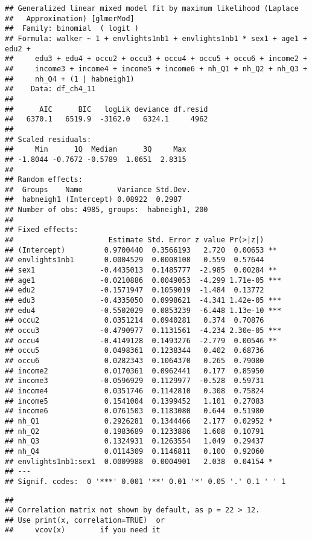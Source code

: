 \documentclass[
]{book}
\begin{document}
\begin{verbatim}
## Generalized linear mixed model fit by maximum likelihood (Laplace
##   Approximation) [glmerMod]
##  Family: binomial  ( logit )
## Formula: walker ~ 1 + envlights1nb1 + envlights1nb1 * sex1 + age1 + edu2 +  
##     edu3 + edu4 + occu2 + occu3 + occu4 + occu5 + occu6 + income2 +  
##     income3 + income4 + income5 + income6 + nh_Q1 + nh_Q2 + nh_Q3 +  
##     nh_Q4 + (1 | habneigh1)
##    Data: df_ch4_11
## 
##      AIC      BIC   logLik deviance df.resid 
##   6370.1   6519.9  -3162.0   6324.1     4962 
## 
## Scaled residuals: 
##     Min      1Q  Median      3Q     Max 
## -1.8044 -0.7672 -0.5789  1.0651  2.8315 
## 
## Random effects:
##  Groups    Name        Variance Std.Dev.
##  habneigh1 (Intercept) 0.08922  0.2987  
## Number of obs: 4985, groups:  habneigh1, 200
## 
## Fixed effects:
##                      Estimate Std. Error z value Pr(>|z|)    
## (Intercept)         0.9700440  0.3566193   2.720  0.00653 ** 
## envlights1nb1       0.0004529  0.0008108   0.559  0.57644    
## sex1               -0.4435013  0.1485777  -2.985  0.00284 ** 
## age1               -0.0210886  0.0049053  -4.299 1.71e-05 ***
## edu2               -0.1571947  0.1059019  -1.484  0.13772    
## edu3               -0.4335050  0.0998621  -4.341 1.42e-05 ***
## edu4               -0.5502029  0.0853239  -6.448 1.13e-10 ***
## occu2               0.0351214  0.0940281   0.374  0.70876    
## occu3              -0.4790977  0.1131561  -4.234 2.30e-05 ***
## occu4              -0.4149128  0.1493276  -2.779  0.00546 ** 
## occu5               0.0498361  0.1238344   0.402  0.68736    
## occu6               0.0282343  0.1064370   0.265  0.79080    
## income2             0.0170361  0.0962441   0.177  0.85950    
## income3            -0.0596929  0.1129977  -0.528  0.59731    
## income4             0.0351746  0.1142810   0.308  0.75824    
## income5             0.1541004  0.1399452   1.101  0.27083    
## income6             0.0761503  0.1183080   0.644  0.51980    
## nh_Q1               0.2926281  0.1344466   2.177  0.02952 *  
## nh_Q2               0.1983689  0.1233886   1.608  0.10791    
## nh_Q3               0.1324931  0.1263554   1.049  0.29437    
## nh_Q4               0.0114309  0.1146811   0.100  0.92060    
## envlights1nb1:sex1  0.0009988  0.0004901   2.038  0.04154 *  
## ---
## Signif. codes:  0 '***' 0.001 '**' 0.01 '*' 0.05 '.' 0.1 ' ' 1
\end{verbatim}

\begin{verbatim}
## 
## Correlation matrix not shown by default, as p = 22 > 12.
## Use print(x, correlation=TRUE)  or
##     vcov(x)        if you need it
\end{verbatim}
\end{document}
